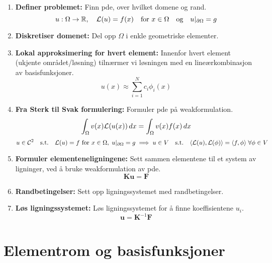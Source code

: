 \begin{enumerate}
	\item \textbf{Definer problemet:} Finn \gls{pde}, over hvilket domene og rand.
	      \[
		      u: \Omega \to \mathbb{R}, \quad \mathcal{L}(u) = f(x) \quad \text{for } x \in \Omega \quad \text{og} \quad u|_{\partial \Omega} = g
	      \]
	\item \textbf{Diskretiser domenet:} Del opp \(\Omega\) i enkle geometriske elementer.
	\item \textbf{Lokal approksimering for hvert element:} Innenfor hvert element (ukjente området/løsning) tilnærmer vi løsningen med en lineærkombinasjon av basisfunksjoner.
	      \[
		      u(x) \approx \sum_{i=1}^N c_i \phi_i(x)
	      \]
	\item \textbf{Fra Sterk til Svak formulering:} Formuler \gls{pde} på \gls{weakformulation}.
	      \[
		      \int_\Omega v(x) \mathcal{L}(u(x)) \, dx = \int_\Omega v(x) f(x) \, dx
	      \]
	      \[
		      u \in \mathcal{C}^2 \quad \text{s.t.} \quad \Lcal(u) = f \text{ for } x \in \Omega, \; u|_{\partial \Omega} = g
		      \implies
		      u \in V \quad \text{s.t.} \quad \inner*{\Lcal(u), \Lcal(\phi)} = \inner*{f, \phi} \; \forall \phi \in V
	      \]
	\item \textbf{Formuler elementeneligningene:} Sett sammen elementene til et system av ligninger, ved å bruke \gls{weakformulation} av \gls{pde}.
	      \[
		      \symbf{K} \symbf{u} = \symbf{F}
	      \]
	\item \textbf{Randbetingelser:} Sett opp ligningssystemet med randbetingelser.
	\item \textbf{Løs ligningssystemet:} Løs ligningssystemet for å finne koeffisientene \(u_i\).
	      \[
		      \symbf{u} = \symbf{K}^{-1} \symbf{F}
	      \]
\end{enumerate}

\section{Elementrom og basisfunksjoner}
